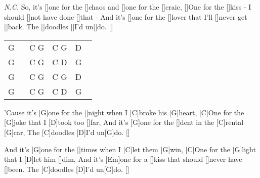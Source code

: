 \begin{guitar}
	 {\footnotesize\textit{N.C.}}
	So, it's []one for the []chaos and []one for the []craic,
	[]One for the []kiss - I should []not have done []that -
	And it's []one for the []lover that I'll []never get []back. 
	The []doodles []I'd un[]do. []{}
	
	
	{\footnotesize\begin{tabular}{|l|l|l|l|}
			G ~ & C G & C G & D ~ \\
			G & C G & C D & G \\
			G & C G & C G & D \\
			G & C G & C D & G 
	\end{tabular}}
	
	'Cause it's [G]one for the []night when I [C]broke his [G]heart,
	[C]One for the [G]joke that I [D]took too []far,
	And it's [G]one for the []dent in the [C]rental [G]car,
	The [C]doodles [D]I'd un[G]do. []{}
	
	And it's [G]one for the []times when I [C]let them [G]win,
	[C]One for the [G]light that I [D]let him []dim,
	And it's [Em]one for a []kiss that should []never have []been. 
	The [C]doodles [D]I'd un[G]do. []{}
\end{guitar}